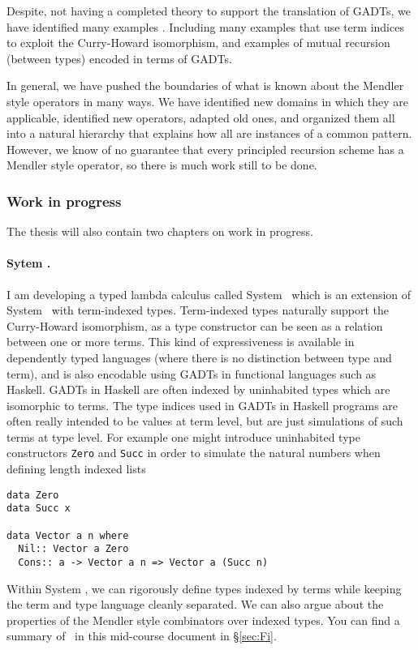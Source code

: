 Despite, not having a completed theory to support the translation of GADTs, we have 
identified many examples \cite{AhnShe11}. Including many examples
that use term indices to exploit the Curry-Howard isomorphism, and
examples of mutual recursion (between types) encoded in terms of GADTs.

In general, we have pushed the boundaries of what is known about the Mendler style
operators in many ways. We have identified new domains in which they are
applicable, identified new operators, adapted old ones, and organized them all
into a natural hierarchy that explains how all are instances of a common pattern.
However, we know of no guarantee that every principled recursion scheme has a
Mendler style operator, so there is much work still to be done.


\subsubsection{Work in progress} \label{Fi}

The thesis will also contain two chapters on work in progress.

\paragraph{Sytem \Fi.}
I am developing a typed lambda calculus called System \Fi\, which is an
extension of System \Fw\ with term-indexed types. Term-indexed types
naturally support the Curry-Howard isomorphism, as
a type constructor can be seen as a relation between one or more terms.
This kind of expressiveness is available in dependently
typed languages (where there is no distinction between type and term),
and is also encodable using GADTs in functional languages such as Haskell.
GADTs in Haskell are often indexed by uninhabited types which are 
isomorphic to terms. The type indices
used in GADTs in Haskell programs are often really intended to be values at term level,
but are just simulations of such terms at type level.
For example one might introduce uninhabited type constructors \verb+Zero+
and \verb+Succ+ in order to simulate the natural numbers when defining length indexed lists
\begin{verbatim}
data Zero
data Succ x

data Vector a n where
  Nil:: Vector a Zero
  Cons:: a -> Vector a n => Vector a (Succ n)
\end{verbatim}  

Within System \Fi, we can rigorously define types indexed by terms
while keeping the term and type language cleanly separated. We can also
argue about the properties of the Mendler style combinators over indexed types.
You can find a summary of \Fi\ in this mid-course document in \S\ref{sec:Fi}.

